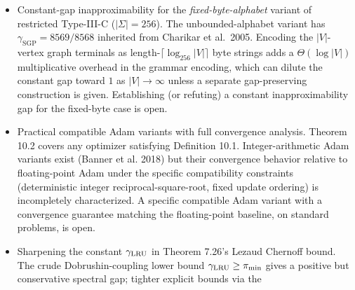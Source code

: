 \documentclass[
]{article}
\begin{document}
\begin{itemize}
  \emph{Conjecture 4.3e (Varying-parameter $E_{12}$ constant-gap
  inapproximability).} We conjecture that there exists a constant
  $\varepsilon > 0$ such that the varying-parameter $E_{12}$
  learned-code labeling problem is NP-hard to approximate within
  factor $1 + \varepsilon$. Motivation: Remark 4.3c proves
  NP-hardness with vanishing gap $1 + 1/(n-1)$; analogous
  combinatorial problems (NCP per Arora-Babai-Stern-Sweedyk 1997,
  CVP per Dinur-Kindler-Raz-Safra 2003) admit constant-gap
  inapproximability via PCP-style gap amplification, suggesting
  that a similar argument may apply to $E_{12}$ once a suitable
  source problem with the right structural properties is identified.
  The conjecture is restricted to the \emph{varying-parameter} case
  (both $n$ and $m$ part of the input); the fixed practical instance
  $n = 256$, $m = 12$ is constant-size and not asymptotically
  NP-hard. A PTAS for varying-parameter $E_{12}$ (polynomial-time
  $(1 + \varepsilon)$-approximation for every $\varepsilon > 0$)
  would refute this conjecture.
\item
  Constant-gap inapproximability for the \emph{fixed-byte-alphabet}
  variant of restricted Type-III-C ($|\Sigma| = 256$). The
  unbounded-alphabet variant has $\gamma_{\mathrm{SGP}} = 8569/8568$
  inherited from Charikar et al.\ 2005. Encoding the
  $|V|$-vertex graph terminals as length-$\lceil \log_{256}|V| \rceil$
  byte strings adds a $\Theta(\log |V|)$ multiplicative overhead in
  the grammar encoding, which can dilute the constant gap toward
  $1$ as $|V| \to \infty$ unless a separate gap-preserving
  construction is given. Establishing (or refuting) a constant
  inapproximability gap for the fixed-byte case is open.
\item
  Practical compatible Adam variants with full convergence
  analysis. Theorem 10.2 covers any optimizer satisfying Definition
  10.1. Integer-arithmetic Adam variants exist (Banner et al. 2018)
  but their convergence behavior relative to floating-point Adam
  under the specific compatibility constraints (deterministic
  integer reciprocal-square-root, fixed update ordering) is
  incompletely characterized. A specific compatible Adam variant
  with a convergence guarantee matching the floating-point
  baseline, on standard problems, is open.
\item
  Sharpening the constant $\gamma_{\rm LRU}$ in Theorem 7.26's
  Lezaud Chernoff bound. The crude Dobrushin-coupling lower bound
  $\gamma_{\rm LRU} \geq \pi_{\rm min}$ gives a positive but
  conservative spectral gap; tighter explicit bounds via the

\end{itemize}
\end{document}
